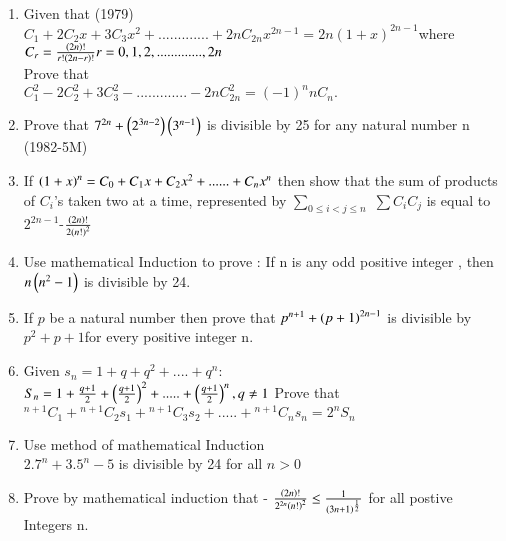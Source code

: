 \documentclass[journal,12pt,twocolumn]{IEEEtran}
\theoremstyle{remark}
\begin{document}
\begin{enumerate}
             \item Given that  \hfill{(1979)}
		    \\ $C_1+2C_2x+3C_3x^2+.............+2nC_{2n}x^{2n-1}= 2n(1+x)^{2n-1}$where $C_r=\frac{\left(2n\right)!}{r!\left(2n-r\right)!}\\  r=0,1,2,.............,2n$\\
     Prove that\\	$C^2_1-2C_2^2+3C_3^2-.............-2nC_{2n}^2  = (-1)^nnC_n.$ \\

	      \item Prove that $7^{2n} + \left(2^{3n-2}\right) \left(3^{n-1}\right) $ is divisible by 25 for any natural number n \hfill{(1982-5M)}  \\

             \item If $\left(1+x\right)^n= C_0 + C_1x +C_2x^2+......+C_nx^n$ then show that the sum of products of $ C_i$'s taken
		     two at a time, represented by $\displaystyle\sum_{0 \leq i<j \leq n}$ $\displaystyle\sum C_i C_j$ is equal to $2^{2n-1}$-$\frac{\left(2n\right)!} {2\left(n!\right)^2}$ \hfill{}\\

	     \item Use mathematical Induction to prove : If n is any odd positive integer , then $n\left(n^2-1\right)$ is divisible by 24. \hfill{}\\

	    \item If $p$ be a natural number then prove that $p^{n+1}+\left(p+1\right)^{2n-1}$ is divisible by $p^2+p+1$for every positive integer n. \hfill{} \\

            \item Given  $ s_n = 1 + q + q^2 +....+q^n:$\\
		    $S_n = 1 + \frac{q+1}{2}+\left(\frac{q+1}{2}\right)^2+.....+\left(\frac{q+1}{2}\right)^n,q\neq1$ Prove that\\
		    ${}^{n+1}C_1+{}^{n+1}C_2s_1+{}^{n+1}C_3s_2+.....+{}^{n+1}C_ns_n=2^nS_n$     \hfill{}\\
	    \item Use method of mathematical Induction\\$ 2.7^n +3.5^n-5$ is divisible by 24 for all $n>0$ \hfill{}\\

	    \item Prove by mathematical induction that -
		    $\frac{\left(2n\right)!}{2^{2n}\left(n!\right)^2}\leq \frac{1}{\left(3n+1\right)^{\frac{1}{2}}}$  for all postive Integers n.\hfill {}


\end{enumerate}
\end{document}
